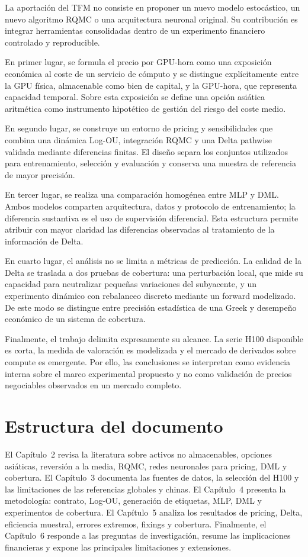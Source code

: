 La aportación del TFM no consiste en proponer un nuevo modelo estocástico, un nuevo
algoritmo RQMC o una arquitectura neuronal original. Su contribución es integrar
herramientas consolidadas dentro de un experimento financiero controlado y
reproducible.

En primer lugar, se formula el precio por GPU-hora como una exposición económica
al coste de un servicio de cómputo y se distingue explícitamente entre la GPU
física, almacenable como bien de capital, y la GPU-hora, que representa capacidad
temporal. Sobre esta exposición se define una opción asiática aritmética como
instrumento hipotético de gestión del riesgo del coste medio.

En segundo lugar, se construye un entorno de pricing y sensibilidades que combina
una dinámica Log-OU, integración RQMC y una Delta pathwise validada mediante
diferencias finitas. El diseño separa los conjuntos utilizados para entrenamiento,
selección y evaluación y conserva una muestra de referencia de mayor precisión.

En tercer lugar, se realiza una comparación homogénea entre MLP y DML. Ambos
modelos comparten arquitectura, datos y protocolo de entrenamiento; la diferencia
sustantiva es el uso de supervisión diferencial. Esta estructura permite atribuir
con mayor claridad las diferencias observadas al tratamiento de la información de
Delta.

En cuarto lugar, el análisis no se limita a métricas de predicción. La calidad de
la Delta se traslada a dos pruebas de cobertura: una perturbación local, que mide
su capacidad para neutralizar pequeñas variaciones del subyacente, y un experimento
dinámico con rebalanceo discreto mediante un forward modelizado. De este modo se
distingue entre precisión estadística de una Greek y desempeño económico de un
sistema de cobertura.

Finalmente, el trabajo delimita expresamente su alcance. La serie H100 disponible
es corta, la medida de valoración es modelizada y el mercado de derivados sobre
compute es emergente. Por ello, las conclusiones se interpretan como evidencia
interna sobre el marco experimental propuesto y no como validación de precios
negociables observados en un mercado completo.

\section{Estructura del documento}
\label{sec:estructura_documento}

El Capítulo~2 revisa la literatura sobre activos no almacenables, opciones
asiáticas, reversión a la media, RQMC, redes neuronales para pricing, DML y
cobertura. El Capítulo~3 documenta las fuentes de datos, la selección del H100 y
las limitaciones de las referencias globales y chinas. El Capítulo~4 presenta la
metodología: contrato, Log-OU, generación de etiquetas, MLP, DML y experimentos
de cobertura. El Capítulo~5 analiza los resultados de pricing, Delta, eficiencia
muestral, errores extremos, fixings y cobertura. Finalmente, el Capítulo~6 responde
a las preguntas de investigación, resume las implicaciones financieras y expone
las principales limitaciones y extensiones.